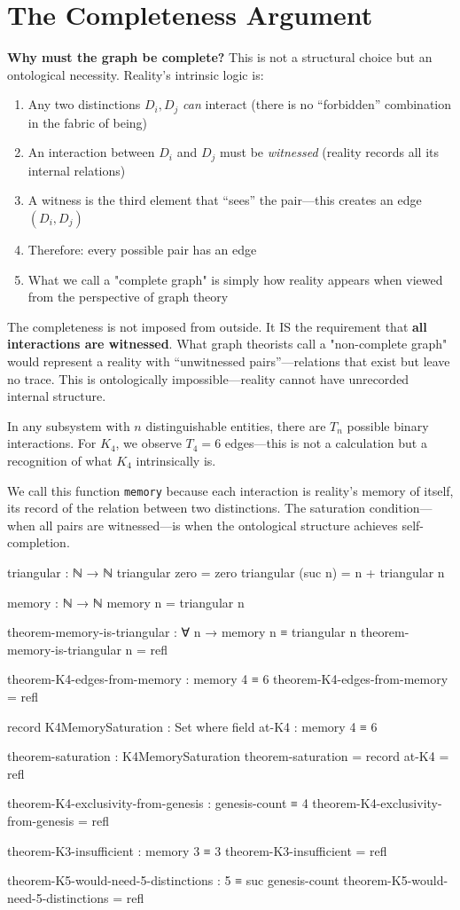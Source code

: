 \documentclass[11pt,a4paper]{book}
\begin{document}
\section{The Completeness Argument}

\textbf{Why must the graph be complete?} This is not a structural choice but an ontological necessity. Reality's intrinsic logic is:
\begin{enumerate}
\item Any two distinctions $D_i, D_j$ \emph{can} interact (there is no ``forbidden'' combination in the fabric of being)
\item An interaction between $D_i$ and $D_j$ must be \emph{witnessed} (reality records all its internal relations)
\item A witness is the third element that ``sees'' the pair---this creates an edge $(D_i, D_j)$
\item Therefore: every possible pair has an edge
\item What we call a "complete graph" is simply how reality appears when viewed from the perspective of graph theory
\end{enumerate}

The completeness is not imposed from outside. It IS the requirement that 
\textbf{all interactions are witnessed}. What graph theorists call a "non-complete graph" would represent a reality with ``unwitnessed pairs''---relations 
that exist but leave no trace. This is ontologically impossible—reality cannot have unrecorded internal structure.

In any subsystem with $n$ distinguishable entities, there are $T_n$ possible binary interactions. 
For $K_4$, we observe $T_4 = 6$ edges—this is not a calculation but a recognition of what $K_4$ intrinsically is.

We call this function \texttt{memory} because each interaction is reality's memory of itself, its record of the relation between two distinctions.
The saturation condition—when all pairs are witnessed—is when the ontological structure achieves self-completion.

\begin{code}
triangular : ℕ → ℕ
triangular zero = zero
triangular (suc n) = n + triangular n

memory : ℕ → ℕ
memory n = triangular n

theorem-memory-is-triangular : ∀ n → memory n ≡ triangular n
theorem-memory-is-triangular n = refl

theorem-K4-edges-from-memory : memory 4 ≡ 6
theorem-K4-edges-from-memory = refl

record K4MemorySaturation : Set where
  field
    at-K4 : memory 4 ≡ 6

theorem-saturation : K4MemorySaturation
theorem-saturation = record { at-K4 = refl }

theorem-K4-exclusivity-from-genesis : genesis-count ≡ 4
theorem-K4-exclusivity-from-genesis = refl

theorem-K3-insufficient : memory 3 ≡ 3
theorem-K3-insufficient = refl

theorem-K5-would-need-5-distinctions : 5 ≡ suc genesis-count
theorem-K5-would-need-5-distinctions = refl
\end{code}
\end{document}
